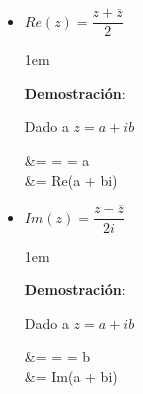 \documentclass[12pt, fleqn]{report}                             %
\newenvironment{SmallIndentation}[1][0.75em]                    %
        {\begin{adjustwidth}{#1}{}\begin{footnotesize}}             %
        {\end{footnotesize}\end{adjustwidth}}                       %
\def \Eq {equation}                                             %
\newenvironment{MultiLineEquation*}[1]                          %
        {\begin{\Eq*}\begin{alignedat}{#1}}                         %
        {\end{alignedat}\end{\Eq*}}                                 %
\newcommand \Over               {\overline}                     %
\theoremstyle{break}                                            %
\begin{document}
\begin{itemize}
                    \begin{SmallIndentation}[1em]
                        \textbf{Demostración}:
                        $z \cdot \Over{z} = (a+ib) \cdot (a-ib) = a^2 + b^2 = |z|^2$

                    \end{SmallIndentation}

                \item
                    $Re(z) = \dfrac{z+\Over{z}}{2}$
                    
                    \begin{SmallIndentation}[1em]
                        \textbf{Demostración}:
                            
                        Dado a $z = a+ib$
                        \begin{MultiLineEquation*}{2}
                            \dfrac{z+\Over{z}}{2}   &= 
                                                     = 
                                                     = a                            \\
                                                    &= Re(a + bi)
                        \end{MultiLineEquation*}

                    \end{SmallIndentation}

                \item
                    $Im(z) = \dfrac{z-\Over{z}}{2i}$

                    \begin{SmallIndentation}[1em]
                        \textbf{Demostración}:
                            
                        Dado a $z = a+ib$
                        \begin{MultiLineEquation*}{2}
                            \dfrac{z-\Over{z}}{2i}  &= 
                                                     = 
                                                     = b                            \\
                                                    &= Im(a + bi)
                        \end{MultiLineEquation*}

                    \end{SmallIndentation}
            \end{itemize}
\end{document}
